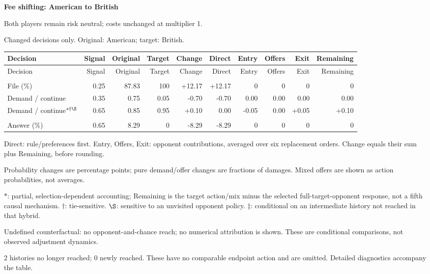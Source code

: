 \documentclass[10pt]{article}
\begin{document}
{\large\bfseries Fee shifting: American to British}\par
Both players remain risk neutral; costs unchanged at multiplier 1.\par
{\small Changed decisions only. Original: American; target: British.}\par
{\small\setlength{\tabcolsep}{3pt}\begin{longtable}{@{}>{\raggedright\arraybackslash}p{1.65in}rrrrrrrrr@{}}
\toprule Decision & Signal & Original & Target & Change & Direct & Entry & Offers & Exit & Remaining \\\midrule\endfirsthead
\toprule Decision & Signal & Original & Target & Change & Direct & Entry & Offers & Exit & Remaining \\\midrule\endhead
\bottomrule\endfoot
\multicolumn{10}{@{}l}{\textbf{Plaintiff}}\\
File (\%) & 0.25 & 87.83 & 100 & +12.17 & +12.17 & 0 & 0 & 0 & 0\\
Demand / continue & 0.35 & 0.75 & 0.05 & -0.70 & -0.70 & 0.00 & 0.00 & 0.00 & 0.00\\
Demand / continue$^{*\dagger\S}$ & 0.65 & 0.85 & 0.95 & +0.10 & 0.00 & -0.05 & 0.00 & +0.05 & +0.10\\
\multicolumn{10}{@{}l}{\textbf{Defendant}}\\
Answer (\%) & 0.65 & 8.29 & 0 & -8.29 & -8.29 & 0 & 0 & 0 & 0\\
\end{longtable}}
{\footnotesize Direct: rule/preferences first. Entry, Offers, Exit: opponent contributions, averaged over six replacement orders. Change equals their sum plus Remaining, before rounding.\par
Probability changes are percentage points; pure demand/offer changes are fractions of damages. Mixed offers are shown as action probabilities, not averages.\par
$*$: partial, selection-dependent accounting; Remaining is the target action/mix minus the selected full-target-opponent response, not a fifth causal mechanism. $\dagger$: tie-sensitive. $\S$: sensitive to an unvisited opponent policy. $\ddagger$: conditional on an intermediate history not reached in that hybrid.\par
Undefined counterfactual: no opponent-and-chance reach; no numerical attribution is shown. These are conditional comparisons, not observed adjustment dynamics.\par
2 histories no longer reached; 0 newly reached. These have no comparable endpoint action and are omitted. Detailed diagnostics accompany the table.}\par
\end{document}
